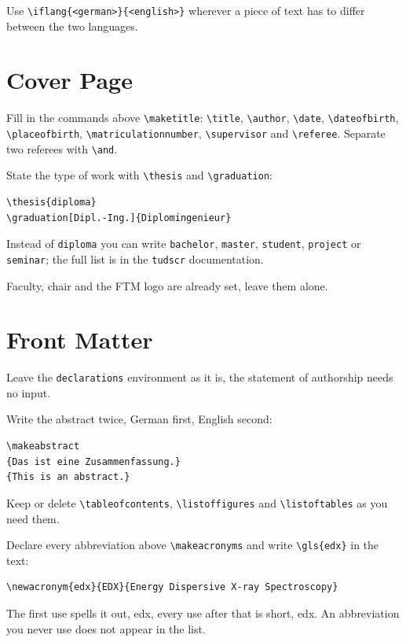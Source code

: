 \documentclass[lang=en]{ftmthesis}
\begin{document}
Use \verb|\iflang{<german>}{<english>}| wherever a piece of text has to differ between the two languages.

\section{Cover Page}
Fill in the commands above \verb|\maketitle|: \verb|\title|, \verb|\author|, \verb|\date|, \verb|\dateofbirth|, \verb|\placeofbirth|, \verb|\matriculationnumber|, \verb|\supervisor| and \verb|\referee|.
Separate two referees with \verb|\and|.

State the type of work with \verb|\thesis| and \verb|\graduation|:
\begin{lstlisting}[language={[LaTeX]TeX}]
\thesis{diploma}
\graduation[Dipl.-Ing.]{Diplomingenieur}
\end{lstlisting}
Instead of \texttt{diploma} you can write \texttt{bachelor}, \texttt{master}, \texttt{student}, \texttt{project} or \texttt{seminar}; the full list is in the \texttt{tudscr} documentation.

Faculty, chair and the FTM logo are already set, leave them alone.

\section{Front Matter}
Leave the \texttt{declarations} environment as it is, the statement of authorship needs no input.

Write the abstract twice, German first, English second:
\begin{lstlisting}[language={[LaTeX]TeX}]
\makeabstract
{Das ist eine Zusammenfassung.}
{This is an abstract.}
\end{lstlisting}

Keep or delete \verb|\tableofcontents|, \verb|\listoffigures| and \verb|\listoftables| as you need them.

Declare every abbreviation above \verb|\makeacronyms| and write \verb|\gls{edx}| in the text:
\begin{lstlisting}[language={[LaTeX]TeX}]
\newacronym{edx}{EDX}{Energy Dispersive X-ray Spectroscopy}
\end{lstlisting}
The first use spells it out, \gls{edx}, every use after that is short, \gls{edx}.
An abbreviation you never use does not appear in the list.
\end{document}
